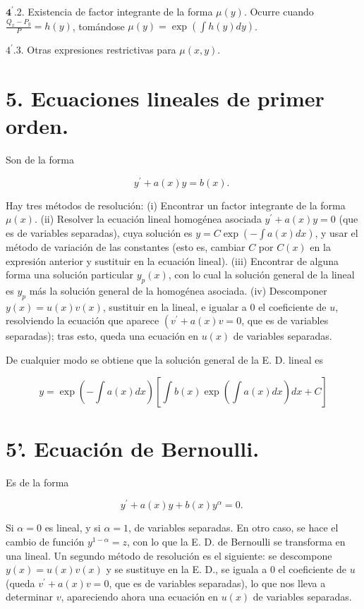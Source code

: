 \documentclass[10pt]{article}
\begin{document}
$\mathbf{4}^{\prime}$.2. Existencia de factor integrante de la forma $\mu(y)$. Ocurre cuando $\frac{Q_{x}-P_{y}}{P}=h(y)$, tomándose $\mu(y)=\exp \left(\int h(y) d y\right)$.

$4^{\prime}$.3. Otras expresiones restrictivas para $\mu(x, y)$.

\section*{5. Ecuaciones lineales de primer orden.}
Son de la forma

$$
y^{\prime}+a(x) y=b(x) \text {. }
$$

Hay tres métodos de resolución: (i) Encontrar un factor integrante de la forma $\mu(x)$. (ii) Resolver la ecuación lineal homogénea asociada $y^{\prime}+a(x) y=0$ (que es de variables separadas), cuya solución es $y=C \exp \left(-\int a(x) d x\right)$, y usar el método de variación de las constantes (esto es, cambiar $C$ por $C(x)$ en la expresión anterior y sustituir en la ecuación lineal). (iii) Encontrar de alguna forma una solución particular $y_{p}(x)$, con lo cual la solución general de la lineal es $y_{p}$ más la solución general de la homogénea asociada. (iv) Descomponer $y(x)=u(x) v(x)$, sustituir en la lineal, e igualar a 0 el coeficiente de $u$, resolviendo la ecuación que aparece $\left(v^{\prime}+a(x) v=0\right.$, que es de variables separadas); tras esto, queda una ecuación en $u(x)$ de variables separadas.

De cualquier modo se obtiene que la solución general de la E. D. lineal es

$$
y=\exp \left(-\int a(x) d x\right)\left[\int b(x) \exp \left(\int a(x) d x\right) d x+C\right]
$$

\section*{5'. Ecuación de Bernoulli.}
Es de la forma

$$
y^{\prime}+a(x) y+b(x) y^{\alpha}=0 \text {. }
$$

Si $\alpha=0$ es lineal, y si $\alpha=1$, de variables separadas. En otro caso, se hace el cambio de función $y^{1-\alpha}=z$, con lo que la E. D. de Bernoulli se transforma en una lineal. Un segundo método de resolución es el siguiente: se descompone $y(x)=u(x) v(x)$ y se sustituye en la E. D., se iguala a 0 el coeficiente de $u$ (queda $v^{\prime}+a(x) v=0$, que es de variables separadas), lo que nos lleva a determinar $v$, apareciendo ahora una ecuación en $u(x)$ de variables separadas.
\end{document}
